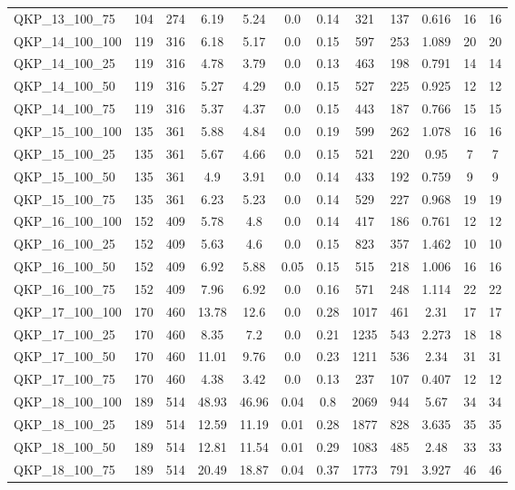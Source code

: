 \begin{table}[!h]
{\begin{tabular}{lccccccccccc}
QKP\_13\_100\_75 & 104 & 274 & 6.19 & 5.24 & 0.0 & 0.14 & 321 & 137 & 0.616 & 16 & 16\\
QKP\_14\_100\_100 & 119 & 316 & 6.18 & 5.17 & 0.0 & 0.15 & 597 & 253 & 1.089 & 20 & 20\\
QKP\_14\_100\_25 & 119 & 316 & 4.78 & 3.79 & 0.0 & 0.13 & 463 & 198 & 0.791 & 14 & 14\\
QKP\_14\_100\_50 & 119 & 316 & 5.27 & 4.29 & 0.0 & 0.15 & 527 & 225 & 0.925 & 12 & 12\\
QKP\_14\_100\_75 & 119 & 316 & 5.37 & 4.37 & 0.0 & 0.15 & 443 & 187 & 0.766 & 15 & 15\\
QKP\_15\_100\_100 & 135 & 361 & 5.88 & 4.84 & 0.0 & 0.19 & 599 & 262 & 1.078 & 16 & 16\\
QKP\_15\_100\_25 & 135 & 361 & 5.67 & 4.66 & 0.0 & 0.15 & 521 & 220 & 0.95 & 7 & 7\\
QKP\_15\_100\_50 & 135 & 361 & 4.9 & 3.91 & 0.0 & 0.14 & 433 & 192 & 0.759 & 9 & 9\\
QKP\_15\_100\_75 & 135 & 361 & 6.23 & 5.23 & 0.0 & 0.14 & 529 & 227 & 0.968 & 19 & 19\\
QKP\_16\_100\_100 & 152 & 409 & 5.78 & 4.8 & 0.0 & 0.14 & 417 & 186 & 0.761 & 12 & 12\\
QKP\_16\_100\_25 & 152 & 409 & 5.63 & 4.6 & 0.0 & 0.15 & 823 & 357 & 1.462 & 10 & 10\\
QKP\_16\_100\_50 & 152 & 409 & 6.92 & 5.88 & 0.05 & 0.15 & 515 & 218 & 1.006 & 16 & 16\\
QKP\_16\_100\_75 & 152 & 409 & 7.96 & 6.92 & 0.0 & 0.16 & 571 & 248 & 1.114 & 22 & 22\\
QKP\_17\_100\_100 & 170 & 460 & 13.78 & 12.6 & 0.0 & 0.28 & 1017 & 461 & 2.31 & 17 & 17\\
QKP\_17\_100\_25 & 170 & 460 & 8.35 & 7.2 & 0.0 & 0.21 & 1235 & 543 & 2.273 & 18 & 18\\
QKP\_17\_100\_50 & 170 & 460 & 11.01 & 9.76 & 0.0 & 0.23 & 1211 & 536 & 2.34 & 31 & 31\\
QKP\_17\_100\_75 & 170 & 460 & 4.38 & 3.42 & 0.0 & 0.13 & 237 & 107 & 0.407 & 12 & 12\\
QKP\_18\_100\_100 & 189 & 514 & 48.93 & 46.96 & 0.04 & 0.8 & 2069 & 944 & 5.67 & 34 & 34\\
QKP\_18\_100\_25 & 189 & 514 & 12.59 & 11.19 & 0.01 & 0.28 & 1877 & 828 & 3.635 & 35 & 35\\
QKP\_18\_100\_50 & 189 & 514 & 12.81 & 11.54 & 0.01 & 0.29 & 1083 & 485 & 2.48 & 33 & 33\\
QKP\_18\_100\_75 & 189 & 514 & 20.49 & 18.87 & 0.04 & 0.37 & 1773 & 791 & 3.927 & 46 & 46\\

\end{tabular}}
\end{table}
